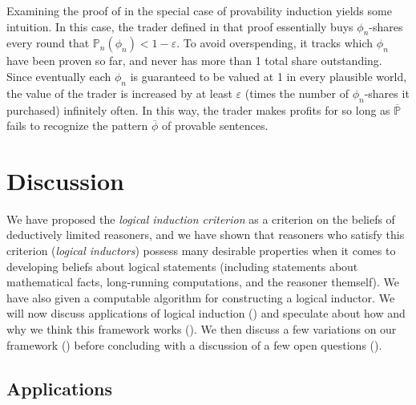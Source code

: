 \documentclass[authordate,onecolumn,noenvironments]{miri-tech-article}
\numberwithin{equation}{subsection}
\newcommand{\seq}[1]{{\overline{#1}}}
\newcommand{\nn}{n}
\newcommand{\phis}{\seq{\phi}}
\newcommand{\lic}{logical induction criterion}
\newcommand{\LIA}{\text{\upshape{\texttt{LIA}}}\xspace}
\newcommand{\BelState}{\mathbb{P}}
\newcommand{\pt}{\BelState}
\newcommand{\MP}{\seq{\pt}}
\begin{document}
\noindent Examining the proof of  in the special case of provability induction yields some intuition. In this case, the trader defined in that proof essentially buys $\phi_\nn$-shares every round that $\pt_\nn(\phi_\nn) < 1-\varepsilon$. To avoid overspending, it tracks which $\phi_\nn$ have been proven so far, and never has more than 1 total share outstanding. Since eventually each $\phi_\nn$ is guaranteed to be valued at 1 in every plausible world, the value of the trader is increased by at least $\varepsilon$ (times the number of $\phi_\nn$-shares it purchased) infinitely often. In this way, the trader makes profits for so long as $\MP$ fails to recognize the pattern $\phis$ of provable sentences. 










%
%
%
%
%
%
%
%
%
%
%
%
%
%
%
%
%
\section{Discussion}\label{sec:discussion}

We have proposed the \emph{\lic} as a criterion on the beliefs of deductively limited reasoners, and we have shown that reasoners who satisfy this criterion (\emph{logical inductors}) possess many desirable properties when it comes to developing beliefs about logical statements (including statements about mathematical facts, long-running computations, and the reasoner themself). We have also given a computable algorithm \LIA for constructing a logical inductor. We will now discuss applications of logical induction () and speculate about how and why we think this framework works (). We then discuss a few variations on our framework () before concluding with a discussion of a few open questions ().

%
%
%
%
%
%
%
%
%
%
%
%
%
%
%
%
%
\subsection{Applications}\label{sec:applications}
\end{document}
